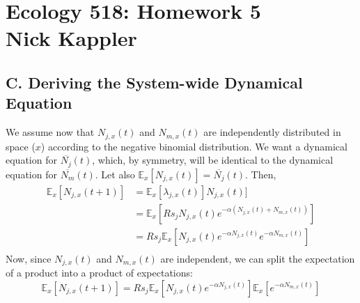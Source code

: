 \documentclass[11pt]{amsart}
\newcommand\Ex[0]{\mathbb{E}_x}
\begin{document}
\sffamily
\section*{Ecology 518: Homework 5\\ Nick Kappler}
\subsection*{C. Deriving the System-wide Dynamical Equation}
We assume now that $N_{j,x}(t)$ and $N_{m,x}(t)$ are independently distributed in space ($x$) according to the negative binomial distribution.  We want a dynamical equation for $\overline{N_j}(t)$, which, by symmetry, will be identical to the dynamical equation for $\overline{N_m}(t)$.  Let also $\Ex[N_{j,x}(t)] = \overline{N_{j}}(t)$.  Then, 
\begin{align*}
\Ex[N_{j,x}(t+1)] &= \Ex[\lambda_{j,x}(t)]N_{j,x}(t)]\\
&=\Ex[Rs_jN_{j,x}(t)e^{-\alpha(N_{j,x}(t) + N_{m,x}(t))}]\\
&=Rs_j\Ex[N_{j,x}(t)e^{-\alpha N_{j,x}(t)}e^{-\alpha N_{m,x}(t)}]\\
\end{align*}
Now, since $N_{j,x}(t)$ and $N_{m,x}(t)$ are independent, we can split the expectation of a product into a product of expectations:
\[
\Ex[N_{j,x}(t+1)] =Rs_j\Ex[N_{j,x}(t)e^{-\alpha N_{j,x}(t)}]\Ex[e^{-\alpha N_{m,x}(t)}]
\]
\end{document}
